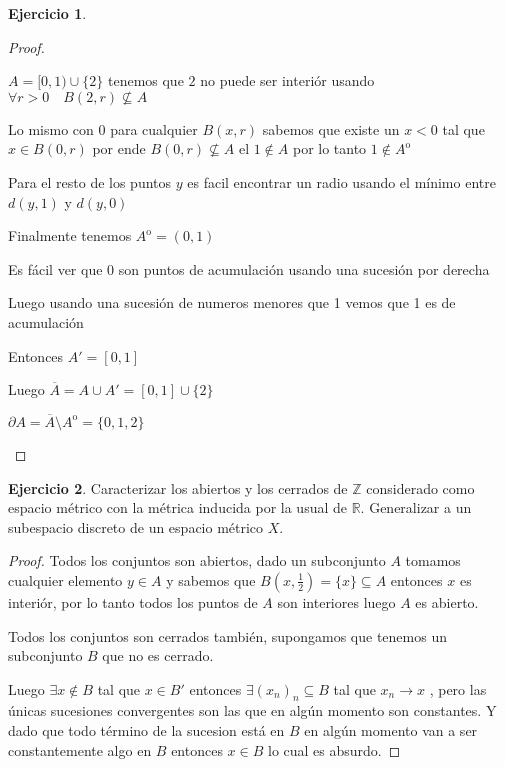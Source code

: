 \documentclass[11pt]{report}
\newcommand{\R}{\mathbb{R}}
\newcommand{\Z}{\mathbb{Z}}
\newcommand{\ra}{\rightarrow}
\newcommand{\ol}{\overline}
\newcommand{\open}{\mathrm{o}}
\theoremstyle{definition}
\newtheorem{ej}{Ejercicio}
\begin{document}
\begin{ej}
\begin{proof}
\begin{enumerate}
$A = [0,1) \cup \{2\}$ tenemos que $2$ no puede ser interiór usando $\forall r > 0 \quad B(2,r) \not\subseteq A$

Lo mismo con $0$ para cualquier $B(x,r)$ sabemos que existe un $x < 0$ tal que $x \in B(0,r)$ por ende $B(0,r) \not\subseteq A$ el $1 \notin A$ por lo tanto $1 \notin A^{\open}$

Para el resto de los puntos $y$ es facil encontrar un radio usando el mínimo entre $d(y,1)$ y $d(y,0)$  

Finalmente tenemos $A^{\open} = (0,1)$

Es fácil ver que $0$ son puntos de acumulación usando una sucesión por derecha

Luego usando una sucesión de numeros menores que 1 vemos que 1 es de acumulación 

Entonces $A' = [0,1] $

Luego $\ol A = A \cup A' = [0,1] \cup \{2\}$

$ \partial A = \ol{A} \setminus A^{\open} = \{0,1,2\} $
    \end{enumerate} 
  \end{proof}
\end{ej}

\begin{ej}
  Caracterizar los abiertos y los cerrados de $\Z$ considerado como espacio métrico con la métrica inducida por la usual de $\R$. Generalizar a un subespacio discreto de un espacio métrico $X$.
  \begin{proof}
     Todos los conjuntos son abiertos, dado un subconjunto $A$ tomamos cualquier elemento $y\in A$ y sabemos que $B(x,\frac{1}{2})=\{x\} \subseteq A$ entonces $x $ es interiór, por lo tanto todos los puntos de $A$ son interiores luego $A$ es abierto.

     Todos los conjuntos son cerrados también, supongamos que tenemos un subconjunto $B$ que no es cerrado.

     Luego $\exists x \notin B$ tal que $x \in B'$ entonces  $\exists (x_n)_n \subseteq B$ tal que $x_n \ra x$ , pero las únicas sucesiones convergentes son las que en algún momento son constantes. Y dado que todo término de la sucesion está en $B$ en algún momento van a ser constantemente algo en $B$ entonces $x \in B$ lo cual es absurdo.
  \end{proof}
\end{ej}
\end{document}
